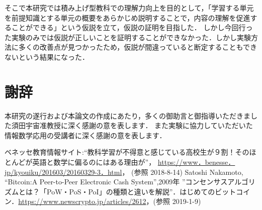 \documentclass[a4j,12pt]{jsarticle}
\begin{document}
そこで本研究では積み上げ型教科での理解力向上を目的として，「学習する単元を前提知識とする単元の概要をあらかじめ説明することで，内容の理解を促進することができる」という仮説を立て，仮説の証明を目指した．
しかし今回行った実験のみでは仮説が正しいことを証明することができなかった．しかし実験方法に多くの改善点が見つかったため，仮説が間違っていると断定することもできないという結果になった．

\newpage
\section{謝辞}
本研究の遂行および本論文の作成にあたり，多くの御助言と御指導いただきました須田宇宙准教授に深く感謝の意を表します．
また実験に協力していただいた情報数学応用の受講者に深く感謝の意を表します．


\newpage
\begin{thebibliography}{9}
ベネッセ教育情報サイト:“教科学習が不得意と感じている高校生が９割！そのほとんどが英語と数学に偏るのにはある理由が”， \url{https://www．benesse．jp/kyouiku/201603/20160329-3．html}， (参照 2018-8-14)
Satoshi Nakamoto, “Bitcoin:A Peer-to-Peer Electronic Cash System”,2009年
 ”コンセンサスアルゴリズムとは？「PoW・PoS・PoI」の種類と違いを解説”．はじめてのビットコイン．\url{https://www.newscrypto.jp/articles/2612}，(参照 2019-1-9)
\end{thebibliography}
\end{document}
